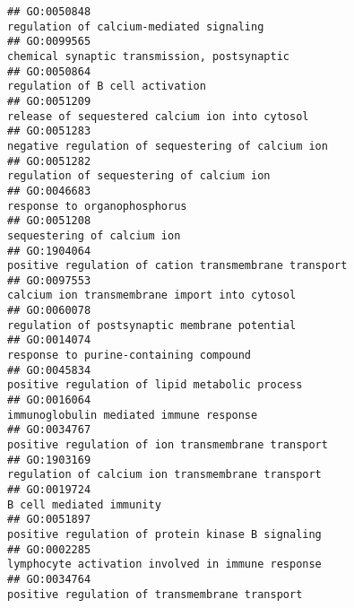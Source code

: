 \documentclass[
]{article}
\begin{document}
\begin{verbatim}
## GO:0050848                                                                                  regulation of calcium-mediated signaling
## GO:0099565                                                                              chemical synaptic transmission, postsynaptic
## GO:0050864                                                                                           regulation of B cell activation
## GO:0051209                                                                           release of sequestered calcium ion into cytosol
## GO:0051283                                                                        negative regulation of sequestering of calcium ion
## GO:0051282                                                                                 regulation of sequestering of calcium ion
## GO:0046683                                                                                              response to organophosphorus
## GO:0051208                                                                                               sequestering of calcium ion
## GO:1904064                                                                     positive regulation of cation transmembrane transport
## GO:0097553                                                                             calcium ion transmembrane import into cytosol
## GO:0060078                                                                             regulation of postsynaptic membrane potential
## GO:0014074                                                                                    response to purine-containing compound
## GO:0045834                                                                            positive regulation of lipid metabolic process
## GO:0016064                                                                                   immunoglobulin mediated immune response
## GO:0034767                                                                        positive regulation of ion transmembrane transport
## GO:1903169                                                                         regulation of calcium ion transmembrane transport
## GO:0019724                                                                                                  B cell mediated immunity
## GO:0051897                                                                         positive regulation of protein kinase B signaling
## GO:0002285                                                                         lymphocyte activation involved in immune response
## GO:0034764                                                                            positive regulation of transmembrane transport

\end{verbatim}
\end{document}
